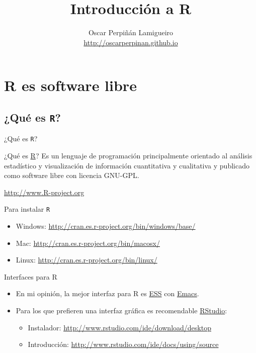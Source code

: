 \documentclass[xcolor={usenames,svgnames,dvipsnames}]{beamer}
\author{Oscar Perpiñán Lamigueiro \\ \url{http://oscarperpinan.github.io}}
\date{}
\title{Introducción a R}
\begin{document}
\maketitle


\section{R es software libre}
\label{sec-1}
\subsection{¿Qué es \texttt{R}?}
\label{sec-1-1}
\begin{frame}[fragile,label=sec-1-1-1]{¿Qué es \texttt{R}?}
 \begin{block}{¿Qué es \href{http://procomun.wordpress.com/2011/02/23/que-es-r/}{R}?}
Es un lenguaje de programación principalmente orientado al
análisis estadístico y visualización de información cuantitativa y
cualitativa y publicado como software libre con licencia GNU-GPL.
\begin{center}
\url{http://www.R-project.org} 
\end{center}
\end{block}
\end{frame}

\begin{frame}[fragile,label=sec-1-1-2]{Para instalar \texttt{R}}
 \begin{itemize}
\item Windows: \url{http://cran.es.r-project.org/bin/windows/base/}
\item Mac: \url{http://cran.es.r-project.org/bin/macosx/}
\item Linux: \url{http://cran.es.r-project.org/bin/linux/}
\end{itemize}
\end{frame}

\begin{frame}[label=sec-1-1-3]{Interfaces para R}
\begin{itemize}
\item En mi opinión, la mejor interfaz para R es \href{http://ess.r-project.org/}{ESS} con \href{http://www.gnu.org/software/emacs/}{Emacs}.
\item Para los que prefieren una interfaz gráfica es recomendable \href{http://www.rstudio.com/ide/}{RStudio}:
\begin{itemize}
\item Instalador: \url{http://www.rstudio.com/ide/download/desktop}
\item Introducción: \url{http://www.rstudio.com/ide/docs/using/source}
\end{itemize}
\end{itemize}
\end{frame}
\end{document}
